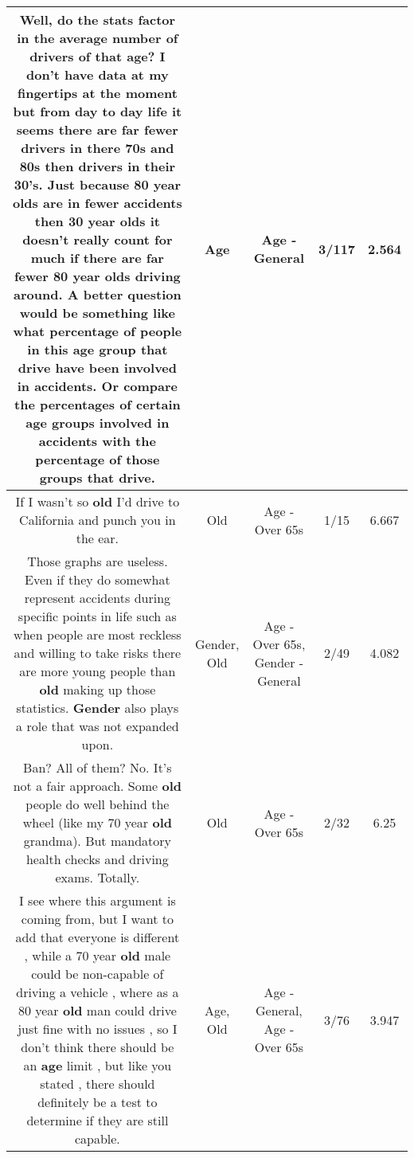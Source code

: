 \documentclass[11pt]{article}
\newlength\mylength
\begin{document}
\begin{center}
\begin{longtable}{|C{.65\mylength}|C{.30\mylength}|C{.12\mylength}|C{.12\mylength}|C{.12\mylength}|}
  \small Well, do the stats factor in the average number of drivers of that \textbf{age}? I don't have data at my fingertips at the moment but from day to day life it seems there are far fewer drivers in there 70s and 80s then drivers in their 30's. Just because 80 year olds are in fewer accidents then 30 year olds it doesn't really count for much if there are far fewer 80 year olds driving around. A better question would be something like what percentage of people in this \textbf{age} group that drive have been involved in accidents. Or compare the percentages of certain \textbf{age} groups involved in accidents with the percentage of those groups that drive.\normalsize   & Age & Age - General & 3/117 & 2.564 \\  \hline
  \small If I wasn't so \textbf{old} I'd drive to California and punch you in the ear.\normalsize   & Old & Age - Over 65s & 1/15 & 6.667 \\  \hline
  \small Those graphs are useless. Even if they do somewhat represent accidents during specific points in life such as when people are most reckless and willing to take risks there are more young people than \textbf{old} making up those statistics. \textbf{Gender} also plays a role that was not expanded upon.\normalsize   & Gender, Old & Age - Over 65s, Gender - General & 2/49 & 4.082 \\  \hline
  \small Ban? All of them? No. It's not a fair approach. Some \textbf{old} people do well behind the wheel (like my 70 year \textbf{old} grandma). But mandatory health checks and driving exams. Totally.\normalsize   & Old & Age - Over 65s & 2/32 & 6.25 \\  \hline
  \small I see where this argument is coming from, but I want to add that everyone is different , while a 70 year \textbf{old} male could be non-capable of driving a vehicle , where as a 80 year \textbf{old} man could drive just fine with no issues , so I don't think there should be an \textbf{age} limit , but like you stated , there should definitely be a test to determine if they are still capable.\normalsize   & Age, Old & Age - General, Age - Over 65s & 3/76 & 3.947 \\  \hline

\end{longtable}
\end{center}
\end{document}
